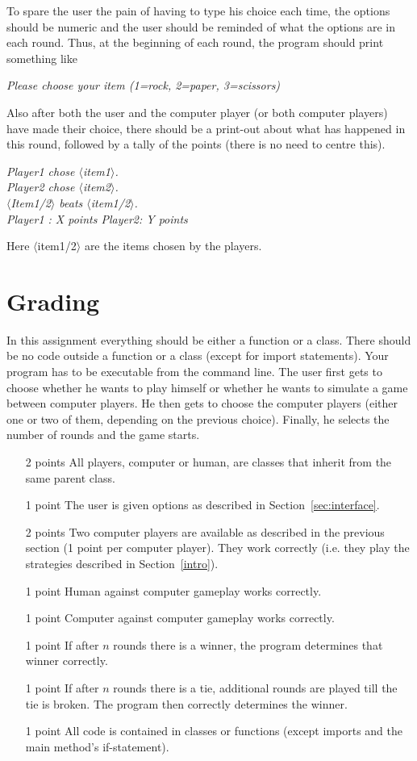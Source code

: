 \documentclass[11pt, leqno, a4paper]{article}
\newcommand{\angles}[1]{$\langle$#1$\rangle$}
\begin{document}
To spare the user the pain of having to type his choice each time, the options should be numeric and the user should be reminded of what the options are in each
round. Thus, at the beginning of each round, the program should print something like
\begin{center}
\textit{Please choose your item (1=rock, 2=paper, 3=scissors)}
\end{center}
Also after both the user and the computer player (or both computer players) have made their choice, there should be a print-out about what has happened in this round,
followed by a tally of the points (there is no need to centre this). 
\begin{center}
\textit{Player1 chose \angles{item1}.\\
Player2 chose \angles{item2}.\\
\angles{Item1/2} beats \angles{item1/2}.\\
Player1 : X points \hspace{0.5cm} Player2: Y points}
\end{center}

Here \angles{item1/2} are the items chosen by the players.

\section{Grading}
In this assignment everything should be either a function or a class. There should be no code outside a function or a class (except for import statements). Your
program has to be executable from the command line. The user first gets to choose whether he wants to play himself or whether he wants to simulate a game between
computer players. He then gets to choose the computer players (either one or two of them, depending on the previous choice). Finally, he selects the number of
rounds and the game starts.
\begin{itemize}
\item[2 points]	All players, computer or human, are classes that inherit from the same parent class.
\item[1 point]	The user is given options as described in Section~\ref{sec:interface}.
\item[2 points]	Two computer players are available as described in the previous section (1 point per computer player). They work correctly 
				(i.e. they play the strategies described in Section~\ref{intro}).
\item[1 point]	Human against computer gameplay works correctly.
\item[1 point]	Computer against computer gameplay works correctly.
\item[1 point]	If after $ n $ rounds there is a winner, the program determines that winner correctly.
\item[1 point]	If after $ n $ rounds there is a tie, additional rounds are played till the tie is broken. The program then correctly determines the winner.
\item[1 point]  All code is contained in classes or functions (except imports and the main method's if-statement).
\end{itemize}
\end{document}

